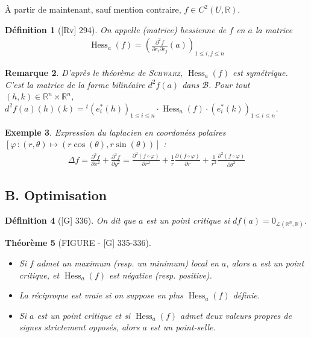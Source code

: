 \documentclass[10pt, a4paper, parskip=full, twoside, twocolumn]{report}
\newtheorem{definition}{Définition}
\newtheorem{theorem}[definition]{Théorème}
\newtheorem{example}[definition]{Exemple}
\newtheorem{remark}[definition]{Remarque}
\newcommand{\IR}{\mathbb{R}}
\newcommand{\B}{\mathcal{B}}
\DeclareMathOperator{\Hess}{Hess}
\begin{document}
\textcolor{paragraphtext}{À partir de maintenant, sauf mention contraire, $f\in C^2(U,\IR)$.}

\begin{definition}[\textnormal{[Rv] 294}]
	On appelle \emph{(matrice) hessienne de $f$ en $a$} la matrice
	\begin{align*}
		\Hess_a(f) = \left(\frac{\partial^2 f}{\partial e_i\partial e_j}(a)\right)_{1\leq i,j\leq n}
	\end{align*}
\end{definition}

\begin{remark}
	D'après le théorème de \textsc{Schwarz}, $\Hess_a(f)$ est symétrique. C'est la matrice de la forme bilinéaire $d^2f(a)$ dans $\B$. Pour tout $(h,k)\in\IR^n\times\IR^n$, $d^2f(a)(h)(k) = {}^t\left(e_i^*(h)\right)_{1\leq i\leq n}\cdot \Hess_a(f)\cdot \left(e_i^*(k)\right)_{1\leq i\leq n}$.
\end{remark}

\begin{example}
	Expression du laplacien en coordonées polaires $[\varphi\,\colon (r,\theta)\mapsto (r\cos(\theta), r\sin(\theta))]$ :
	\begin{align*}
		\Delta f = \frac{\partial^2 f}{\partial x^2} + \frac{\partial^2 f}{\partial y^2} = \frac{\partial^2(f\circ \varphi)}{\partial r^2} + \frac{1}{r}\frac{\partial(f\circ\varphi)}{\partial r} + \frac{1}{r^2}\frac{\partial^2(f\circ \varphi)}{\partial \theta^2}
	\end{align*}
\end{example}

\subsection*{B. Optimisation}
\begin{definition}[\textnormal{[G] 336}]
	On dit que $a$ est un \emph{point critique} si $df(a) = 0_{\mathcal{L}(\IR^n,\IR)}$.
\end{definition}

\begin{theorem}[FIGURE - \textnormal{[G] 335-336}]
	\begin{itemize}
		\item Si $f$ admet un maximum (resp. un minimum) local en $a$, alors $a$ est un point critique, et $\Hess_a(f)$ est négative (resp. positive).
		\item La réciproque est vraie si on suppose en plus $\Hess_a(f)$ définie.
		\item Si $a$ est un point critique et si $\Hess_a(f)$ admet deux valeurs propres de signes strictement opposés, alors $a$ est un \emph{point-selle}.
	\end{itemize}
\end{theorem}
\end{document}
